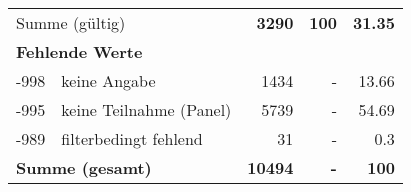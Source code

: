 \begin{longtable}{lXrrr}
     \midrule
     \multicolumn{2}{l}{Summe (gültig)} &
       \textbf{\num{3290}} &
     \textbf{100} &
       \textbf{\num[round-mode=places,round-precision=2]{31,35}} \\
     \multicolumn{5}{l}{\textbf{Fehlende Werte}}\\
       -998 &
       keine Angabe &
         \num{1434} &
        - &
         \num[round-mode=places,round-precision=2]{13,66} \\
       -995 &
       keine Teilnahme (Panel) &
         \num{5739} &
        - &
         \num[round-mode=places,round-precision=2]{54,69} \\
       -989 &
       filterbedingt fehlend &
         \num{31} &
        - &
         \num[round-mode=places,round-precision=2]{0,3} \\
     \midrule
     \multicolumn{2}{l}{\textbf{Summe (gesamt)}} &
          \textbf{\num{10494}} &
        \textbf{-} &
        \textbf{100} \\
     \bottomrule
     \end{longtable}
     
